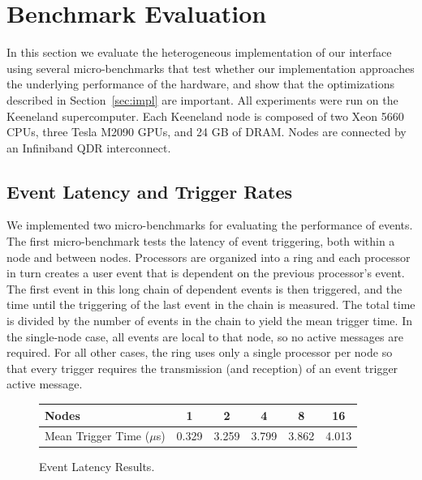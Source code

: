 
\section{Benchmark Evaluation}
\label{sec:micro}

In this section we evaluate the heterogeneous implementation of our 
interface using several micro-benchmarks that test whether our implementation
approaches the underlying performance of the
hardware, and show that the optimizations described in Section~\ref{sec:impl}
are important.  All experiments were run on the Keeneland
supercomputer\cite{Keeneland}.  Each Keeneland node is composed of
two Xeon 5660 CPUs, three Tesla M2090 GPUs, and 24 GB of DRAM.  Nodes
are connected by an Infiniband QDR interconnect.

\subsection{Event Latency and Trigger Rates}
\label{subsec:eventmicro}
We implemented two micro-benchmarks for evaluating the performance of
events.  The first micro-benchmark tests the latency of event triggering,
both within a node and between nodes.  Processors are organized
into a ring and each processor in turn creates a user event that is dependent
on the previous processor's event.  The first event in this long chain of
dependent events is then triggered, and the time until the triggering of the
last event in the chain is measured.  The total time is divided by the number
of events in the chain to yield the mean trigger time.  In the single-node case, all events are local to
that node, so no active messages are required.  For all other cases, the
ring uses only a single processor per node so that every trigger requires
the transmission (and reception) of an event trigger active message.


\begin{figure}
\begin{center}
{ \small
\begin{tabular}{l|c|c|c|c|c}
Nodes & 1 & 2 & 4 & 8 & 16 \\ \hline
Mean Trigger Time ($\mu$s) & 0.329 & 3.259 & 3.799 & 3.862 & 4.013 \\
\end{tabular}
}
\end{center}
\vspace{-2mm}
\caption{Event Latency Results.\label{tab:eventlat}}
\vspace{-4mm}
\end{figure}

